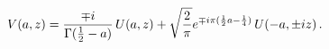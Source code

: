 \[\mathop{V\/}\nolimits\!\left(a,z\right)=\frac{\mp i}{\mathop{\Gamma\/}%
\nolimits(\frac{1}{2}-a)}\mathop{U\/}\nolimits\!\left(a,z\right)+\sqrt{\frac{2%
}{\pi}}e^{\mp i\pi(\frac{1}{2}a-\frac{1}{4})}\mathop{U\/}\nolimits\!\left(-a,%
\pm iz\right).\]